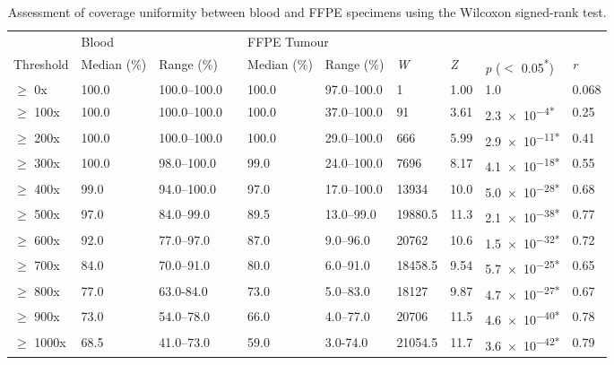 
\begin{table}[H]
\caption{Assessment of coverage uniformity between blood and FFPE specimens using the Wilcoxon signed-rank test.}
\label{tbl:metrics}
\centering
      \begin{tabular}{llllllllll}
        \hline
				\multicolumn{1}{l}{ }
				&
				\multicolumn{2}{l}{Blood}
				&&
				\multicolumn{2}{l}{FFPE Tumour}
				&
				\multicolumn{4}{l}{ } \\
				\cline{2-3}\cline{5-6}
        Threshold & Median (\%) & Range (\%) && Median (\%) & Range (\%) & \textit{W} & \textit{Z} & \textit{p} ($<$ 0.05\textsuperscript{*}) & \textit{r}
				\\
				\hline
				$\geq$ 0x & 100.0 & 100.0--100.0 && 100.0 & 97.0--100.0 & 1 & 1.00 & 1.0 & 0.068
				\\
				$\geq$ 100x & 100.0 & 100.0--100.0 && 100.0 & 37.0--100.0 & 91 & 3.61 & \num{2.3e-4}\textsuperscript{*} & 0.25
				\\
				$\geq$ 200x & 100.0 & 100.0--100.0 && 100.0 & 29.0--100.0 & 666 & 5.99 & \num{2.9e-11}\textsuperscript{*} & 0.41
				\\
				$\geq$ 300x & 100.0 & 98.0--100.0 && 99.0 & 24.0--100.0 & 7696 & 8.17 & \num{4.1e-18}\textsuperscript{*} & 0.55
				\\
				$\geq$ 400x & 99.0 & 94.0--100.0 && 97.0 & 17.0--100.0 & 13934 & 10.0 & \num{5.0e-28}\textsuperscript{*} & 0.68
				\\
				$\geq$ 500x & 97.0 & 84.0--99.0 && 89.5 & 13.0--99.0 & 19880.5 & 11.3 & \num{2.1e-38}\textsuperscript{*} & 0.77
				\\
				$\geq$ 600x & 92.0 & 77.0--97.0 && 87.0 & 9.0--96.0 & 20762 & 10.6 & \num{1.5e-32}\textsuperscript{*} & 0.72
				\\
				$\geq$ 700x & 84.0 & 70.0--91.0 && 80.0 & 6.0--91.0 & 18458.5 & 9.54 & \num{5.7e-25}\textsuperscript{*} & 0.65
				\\
				$\geq$ 800x & 77.0 & 63.0-84.0 && 73.0 & 5.0--83.0 & 18127 & 9.87 & \num{4.7e-27}\textsuperscript{*} & 0.67
				\\
				$\geq$ 900x & 73.0 & 54.0--78.0 && 66.0 & 4.0--77.0 & 20706 & 11.5 & \num{4.6e-40}\textsuperscript{*} & 0.78
				\\
				$\geq$ 1000x & 68.5 & 41.0--73.0 && 59.0 & 3.0-74.0 & 21054.5 & 11.7 & \num{3.6e-42}\textsuperscript{*} & 0.79
				\\
				\hline
      \end{tabular} \\
\end{table}

